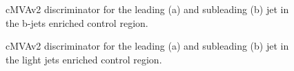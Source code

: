 \begin{figure}[htb]
\centering
{}
\caption{cMVAv2 discriminator for the leading (a) and subleading (b)
jet in the b-jets enriched control region.\label{fig:bpogSF}}
\end{figure}
\begin{figure}[htb]
\centering
{}
\caption{cMVAv2 discriminator for the leading (a) and subleading (b)
jet in the light jets enriched control region.\label{fig:bpogSF_Z}}
\end{figure}




